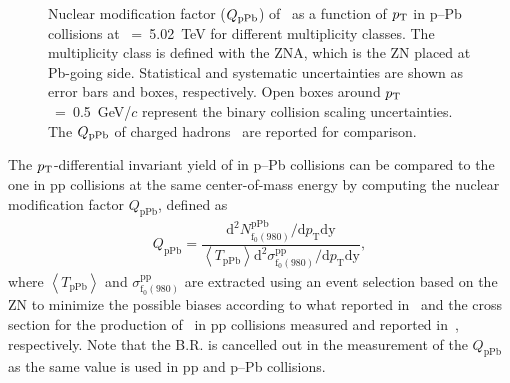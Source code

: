 \begin{figure}[!hbt]
	\centering
	\caption{ Nuclear modification factor ($Q_{\rm{pPb}}$) of \fzero~as a function of $p_{\rm{T}}$ in p--Pb collisions at \snn~=~5.02~TeV for different multiplicity classes. The multiplicity class is defined with the ZNA, which is the ZN placed at Pb-going side. Statistical and systematic uncertainties are shown as error bars and boxes, respectively. Open boxes around $p_{\rm{T}}$~=~0.5~GeV/$c$ represent the binary collision scaling uncertainties. The $Q_{\rm{pPb}}$ of charged hadrons~\cite{ALICE:2014xsp} are reported for comparison. }
	\label{fig:QpPb}
\end{figure}

The $p_{\rm{T}}$-differential invariant yield of \fzero in p--Pb collisions can be compared to the one in pp collisions at the same center-of-mass energy by computing the nuclear modification factor $Q_{\mbox{pPb}}$, defined as 
\begin{eqnarray}
Q_{\mbox{pPb}} = \dfrac{\mathrm{d}^{2} N_{\mathrm{f}_{0}(980)}^{\mathrm{pPb}} / \mathrm{d} p_{\mathrm{T}} \mathrm{dy} }{ \left\langle T_{\mathrm{pPb}} \right\rangle \mathrm{d}^{2} \sigma_{\mathrm{f}_{0}(980)}^{\mathrm{pp}}/ \mathrm{d} p_{\mathrm{T}} \mathrm{dy} },
\end{eqnarray}
where $\left\langle T_{\mathrm{pPb}} \right\rangle$ and $\sigma_{\mathrm{f}_{0}(980)}^{\mathrm{pp}}$ are extracted using an event selection based on the
ZN to minimize the possible biases according to what reported in~\cite{ALICE:2014xsp} and the cross section for the production of \fzero~in pp collisions measured and reported in~\cite{ALICE:2022qnb}, respectively. Note that the B.R. is cancelled out in the measurement of the $Q_{\mbox{pPb}}$ as the same value is used in pp and p--Pb collisions.

